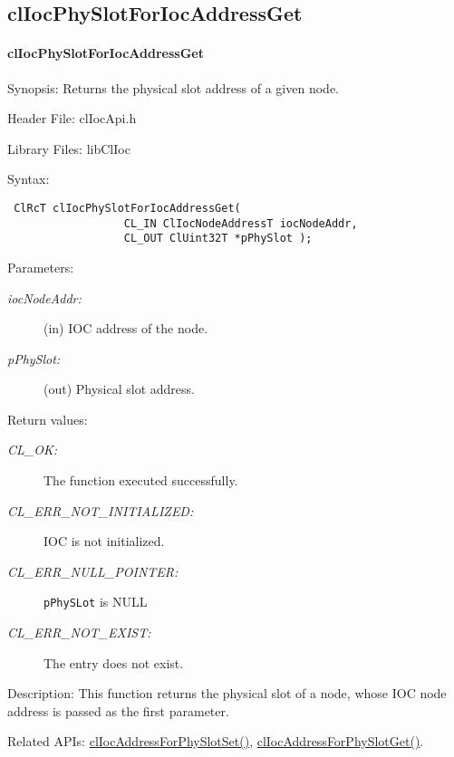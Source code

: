 \begin{flushleft}
\subsection{clIocPhySlotForIocAddressGet}
\hypertarget{pageIOC130}{}\paragraph{cl\-Ioc\-Phy\-Slot\-For\-Ioc\-Address\-Get}\label{pageIOC130}
\begin{Desc}
\item[Synopsis: ]Returns the physical slot address of a given node.\end{Desc}
\begin{Desc}
\item[Header File:]clIocApi.h\end{Desc}
\begin{Desc}
\item[Library Files:]libClIoc\end{Desc}
\begin{Desc}
\item[Syntax: ]

\footnotesize\begin{verbatim} ClRcT clIocPhySlotForIocAddressGet( 
                  CL_IN ClIocNodeAddressT iocNodeAddr, 
                  CL_OUT ClUint32T *pPhySlot ); 
\end{verbatim}
\normalsize
 \end{Desc}
\begin{Desc}
\item[Parameters:]
\begin{description}
\item[{\em ioc\-Node\-Addr:}](in) IOC address of the node. \item[{\em p\-Phy\-Slot:}](out) Physical slot address.\end{description}
\end{Desc}
\begin{Desc}
\item[Return values:]
\begin{description}
\item[{\em CL\_\-OK:}] The function executed successfully. \item[{\em CL\_\-ERR\_\-NOT\_\-INITIALIZED:}] IOC is not initialized. 
\item[{\em CL\_\-ERR\_\-NULL\_\-POINTER:}]{\tt{p\-Phy\-SLot}} is NULL \item[{\em CL\_\-ERR\_\-NOT\_\-EXIST:}]The entry does not exist.
\end{description}
\end{Desc}
\begin{Desc}
\item[Description: ]This function returns the physical slot of a node, whose IOC node address is passed as the first parameter.\end{Desc}
\begin{Desc}
\item[Related APIs:]\hyperlink{pageIOC129}{clIocAddressForPhySlotSet()}, \hyperlink{pageIOC128}
{clIocAddressForPhySlotGet()}. \end{Desc}


\end{flushleft}
